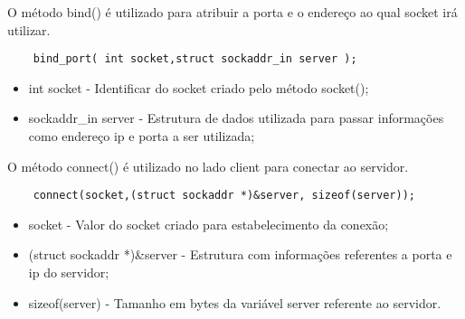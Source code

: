 O método bind() é utilizado para atribuir a porta e o endereço ao qual socket irá utilizar.

\begin{lstlisting}
	bind_port( int socket,struct sockaddr_in server );
\end{lstlisting}	

\begin{itemize}
	\item int socket - Identificar do socket criado pelo método socket();
	\item sockaddr\_in server - Estrutura de dados utilizada para passar informações como endereço ip e porta a ser utilizada;  
\end{itemize}

O método connect() é utilizado no lado client para conectar ao servidor.

\begin{lstlisting}
	connect(socket,(struct sockaddr *)&server, sizeof(server));
\end{lstlisting}

\begin{itemize}
	\item socket - Valor do socket criado para estabelecimento da conexão;
	\item (struct sockaddr *)\&server - Estrutura com informações referentes a porta e ip do servidor;
	\item  sizeof(server) - Tamanho em bytes da variável server referente ao servidor.
\end{itemize}

